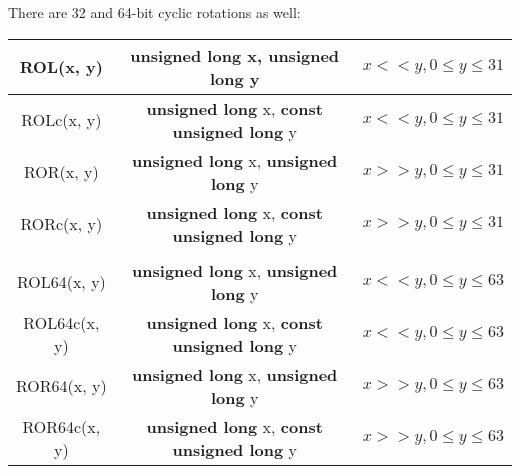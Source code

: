 \documentclass[a4paper]{book}
\begin{document}
There are 32 and 64-bit cyclic rotations as well:
        
\begin{center}
\begin{tabular}{|c|c|c|}
     \hline ROL(x, y) & {\bf unsigned long} x, {\bf unsigned long} y & $x << y, 0 \le y \le 31$ \\
     \hline ROLc(x, y) & {\bf unsigned long} x, {\bf const unsigned long} y & $x << y, 0 \le y \le 31$ \\
     \hline ROR(x, y) & {\bf unsigned long} x, {\bf unsigned long} y & $x >> y, 0 \le y \le 31$ \\
     \hline RORc(x, y) & {\bf unsigned long} x, {\bf const unsigned long} y & $x >> y, 0 \le y \le 31$ \\
     \hline && \\
     \hline ROL64(x, y) & {\bf unsigned long} x, {\bf unsigned long} y & $x << y, 0 \le y \le 63$ \\
     \hline ROL64c(x, y) & {\bf unsigned long} x, {\bf const unsigned long} y & $x << y, 0 \le y \le 63$ \\
     \hline ROR64(x, y) & {\bf unsigned long} x, {\bf unsigned long} y & $x >> y, 0 \le y \le 63$ \\
     \hline ROR64c(x, y) & {\bf unsigned long} x, {\bf const unsigned long} y & $x >> y, 0 \le y \le 63$ \\
     \hline
\end{tabular}
\end{center}
\end{document}
